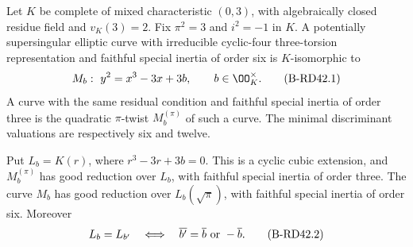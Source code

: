 \begin{lemma}
\label{lem:B-RD42-normal}
Let $K$ be complete of mixed characteristic $(0,3)$, with algebraically
closed residue field and $v_K(3)=2$. Fix $\pi^2=3$ and $i^2=-1$ in $K$.
A potentially supersingular elliptic curve with irreducible cyclic-four
three-torsion representation and faithful special inertia of order six
is $K$-isomorphic to
\[
 M_b:\ y^2=x^3-3x+3b,\qquad b\in\OO_K^\times.
                                                        \tag{B-RD42.1}
\]
A curve with the same residual condition and faithful special inertia
of order three is the quadratic $\pi$-twist $M_b^{(\pi)}$ of such a curve.
The minimal discriminant valuations are respectively six and twelve.

Put $L_b=K(r)$, where $r^3-3r+3b=0$. This is a cyclic cubic extension,
and $M_b^{(\pi)}$ has good reduction over $L_b$, with faithful special
inertia of order three. The curve $M_b$ has good reduction over
$L_b(\sqrt\pi)$, with faithful special inertia of order six. Moreover
\[
 L_b=L_{b'}\quad\Longleftrightarrow\quad
                   \overline {b'}=\overline b\ \hbox{or}\ -\overline b.
                                                        \tag{B-RD42.2}
\]
\end{lemma}
